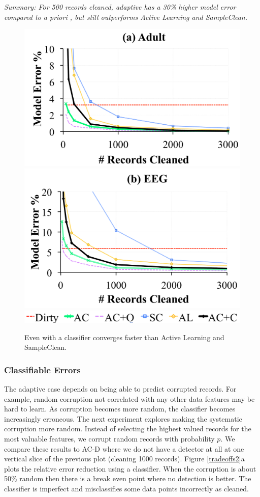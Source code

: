 \vspace{0.25em}

\noindent \emph{Summary: For 500 records cleaned, adaptive \sys has a 30\% higher model error compared to a priori \sys, but still outperforms Active Learning and SampleClean.}

\begin{figure}[ht!]
\centering
 \includegraphics[width=0.49\columnwidth]{exp/exp11a.pdf}
 \includegraphics[width=0.49\columnwidth]{exp/exp11b.pdf}
 \includegraphics[width=0.49\columnwidth]{exp/legend-11.png}\vspace{-0.5em}
 \caption{Even with a classifier \sys converges faster than Active Learning and SampleClean. \label{pred-perf}}\vspace{-1.0em}
\end{figure}


\subsubsection{Classifiable Errors}
The adaptive case depends on being able to predict corrupted records.
For example, random corruption not correlated with any other data features may be hard to learn.
As corruption becomes more random, the classifier becomes increasingly erroneous.
The next experiment explores making the systematic corruption more random.
Instead of selecting the highest valued records for the most valuable features, we corrupt random records with probability $p$. 
We compare these results to AC-D where we do not have a detector at all at one vertical slice of the previous plot (cleaning 1000 records).
Figure \ref{tradeoffs2}a plots the relative error reduction using a classifier.
When the corruption is about 50\% random then there is a break even point where no detection is better.
The classifier is imperfect and misclassifies some data points incorrectly as cleaned.

